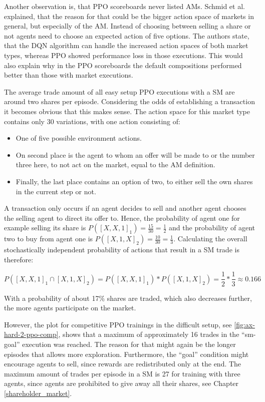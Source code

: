 Another observation is, that PPO scoreboards never listed AMs. Schmid et al. \cite{scbe21} explained, that the reason for that could be the bigger action space of markets in general, but especially of the AM. Instead of choosing between selling a share or not agents need to choose an expected action of five options. The authors state, that the DQN algorithm can handle the increased action spaces of both market types, whereas PPO showed performance loss in those executions. This would also explain why in the PPO scoreboards the default compositions performed better than those with market executions. 

The average trade amount of all easy setup PPO executions with a SM  are around two shares per episode. Considering the odds of establishing a transaction it becomes obvious that this makes sense. The action space for this market type contains only 30 variations, with one action consisting of:
\begin{itemize}
    \item One of five possible environment actions.
    \item On second place is the agent to whom an offer will be made to or the number three here, to not act on the market, equal to the AM definition.
    \item Finally, the last place contains an option of two, to either sell the own shares in the current step or not.
\end{itemize}
A transaction only occurs if an agent decides to sell and another agent chooses the selling agent to direct its offer to. Hence, the probability of agent one for example selling its share is $P([X,X,1]_{1})=\frac{15}{30}=\frac{1}{2}$ and the probability of agent two to buy from agent one is $P([X,1,X]_{2})=\frac{10}{30}=\frac{1}{3}$. Calculating the overall stochastically independent probability of actions that result in a SM trade is therefore: 

\begin{equation}\label{eq:TRPO}
    P([X,X,1]_{1} \cap [X,1,X]_{2})=P([X,X,1]_{1}) * P([X,1,X]_{2}) = \frac{1}{2}*\frac{1}{3} \approx 0.166
\end{equation}

With a probability of about 17\% shares are traded, which also decreases further, the more agents participate on the market.

However, the plot for competitive PPO trainings in the difficult setup, see \ref{fig:ax-hard-2-ppo-comp}, shows that a maximum of approximately 16 trades in the ``sm-goal'' execution was reached. The reason for that might again be the longer episodes that allows more exploration. Furthermore, the ``goal'' condition might encourage agents to sell, since rewards are redistributed only at the end. The maximum amount of trades per episode in a SM is 27 for training with three agents, since agents are prohibited to give away all their shares, see Chapter \ref{shareholder_market}.

